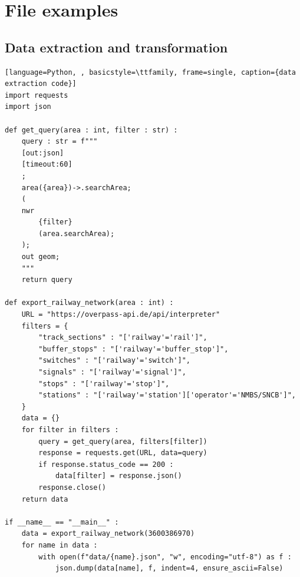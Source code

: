 \chapter{File examples}
\section{Data extraction and transformation}
{\scriptsize
\begin{lstlisting}[language=Python, , basicstyle=\ttfamily, frame=single, caption={data extraction code}]
import requests
import json

def get_query(area : int, filter : str) :
    query : str = f"""
    [out:json]
    [timeout:60]
    ;
    area({area})->.searchArea;
    (
    nwr
        {filter}
        (area.searchArea);
    );
    out geom;
    """
    return query

def export_railway_network(area : int) :
    URL = "https://overpass-api.de/api/interpreter"
    filters = {
        "track_sections" : "['railway'='rail']",
        "buffer_stops" : "['railway'='buffer_stop']",
        "switches" : "['railway'='switch']",
        "signals" : "['railway'='signal']",
        "stops" : "['railway'='stop']",
        "stations" : "['railway'='station']['operator'='NMBS/SNCB']",
    }
    data = {}
    for filter in filters :
        query = get_query(area, filters[filter])
        response = requests.get(URL, data=query)
        if response.status_code == 200 :
            data[filter] = response.json()
        response.close()
    return data

if __name__ == "__main__" :
    data = export_railway_network(3600386970)
    for name in data :
        with open(f"data/{name}.json", "w", encoding="utf-8") as f :
            json.dump(data[name], f, indent=4, ensure_ascii=False)
\end{lstlisting}
}

